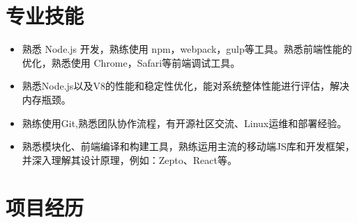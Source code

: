 \documentclass{resume}
\begin{document}
\section{专业技能}
\begin{normalsize}
  \begin{itemize}
    \item 熟悉 Node.js 开发，熟练使用 npm，webpack，gulp等工具。熟悉前端性能的优化，熟悉使用 Chrome，Safari等前端调试工具。
    \item 熟悉Node.js以及V8的性能和稳定性优化，能对系统整体性能进行评估，解决内存瓶颈。
    \item 熟练使用Git,熟悉团队协作流程，有开源社区交流、Linux运维和部署经验。
    \item 熟悉模块化、前端编译和构建工具，熟练运用主流的移动端JS库和开发框架，并深入理解其设计原理，例如：Zepto、React等。

  \end{itemize}
\end{normalsize}



\section{项目经历}
\end{document}
